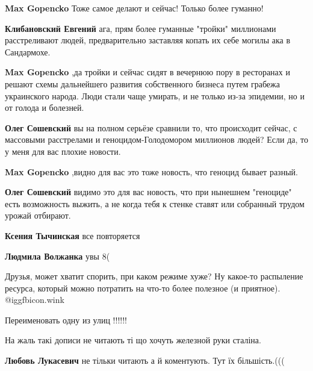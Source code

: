 \begin{itemize}
\begin{itemize}
\begin{itemize} %
\textbf{Max Gopencko} Тоже самое делают и сейчас! Только более гуманно!

\textbf{Клибановский Евгений} ага, прям более гуманные "тройки" миллионами расстреливают людей, предварительно заставляя копать их себе могилы ака в Сандармохе.

\textbf{Max Gopencko} ,да тройки и сейчас сидят в вечернюю пору в ресторанах и решают схемы дальнейшего развития собственного бизнеса путем грабежа украинского народа.
Люди стали чаще умирать, и не только из-за эпидемии, но и от голода и болезней.

\textbf{Олег Сошевский} вы на полном серьёзе сравнили то, что происходит сейчас, с массовыми расстрелами и геноцидом-Голодомором миллионов людей? Если да, то у меня для вас плохие новости.

\textbf{Max Gopencko} ,видно для вас это тоже новость, что геноцид бывает разный.

\textbf{Олег Сошевский} видимо это для вас новость, что при нынешнем "геноциде" есть возможность выжить, а не когда тебя к стенке ставят или собранный трудом урожай отбирают.
\end{itemize} %

\textbf{Ксения Тычинская} все повторяется

\textbf{Людмила Волжанка} увы 8(


Друзья, может хватит спорить, при каком режиме хуже? Ну какое-то распыление
ресурса, который можно потратить на что-то более полезное (и приятное).  @igg{fbicon.wink} 
\end{itemize} %

Переименовать одну из улиц !!!!!!

На жаль такі дописи не читають ті що хочуть железной руки сталіна.

\begin{itemize} %
\textbf{Любовь Лукасевич} не тільки читають а й коментують. Тут їх більшість.(((
\end{itemize} %

\end{itemize} %
